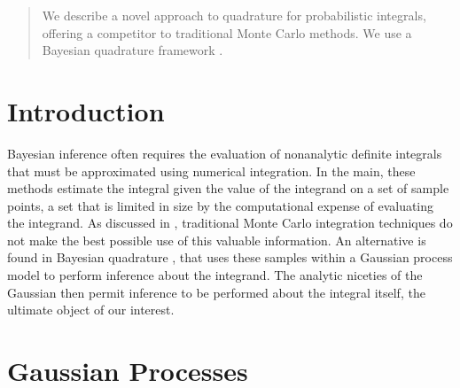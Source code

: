 \documentclass{article}
\begin{document}
 


\begin{abstract} 
We describe a novel approach to quadrature for probabilistic integrals, offering a competitor to traditional Monte Carlo methods. We use a Bayesian quadrature framework \citep{BZHermiteQuadrature,BZMonteCarlo}.
\end{abstract} 

\section{Introduction}

Bayesian inference often requires the evaluation of nonanalytic
definite integrals that must be approximated using numerical
integration.  In the main, these methods estimate the integral given
the value of the integrand on a set of sample points, a set that is limited in size by the computational expense of evaluating the integrand.
As discussed in \citep{MCUnsound}, traditional Monte Carlo
integration techniques do not make the best possible use of this valuable information. An alternative is found in Bayesian quadrature \citep{BZHermiteQuadrature}, that uses these samples within a Gaussian process model to perform inference about the integrand. The analytic niceties of the Gaussian then permit inference to be performed about the integral itself, the ultimate object of our interest.

\section{Gaussian Processes}
\end{document}
